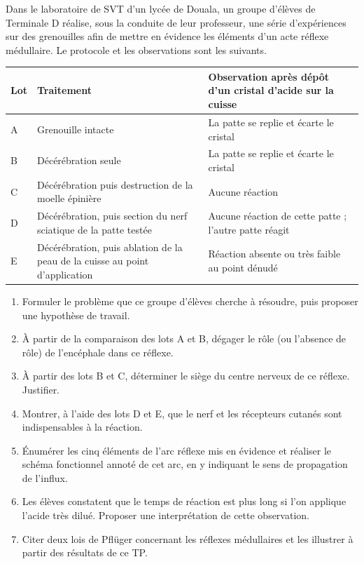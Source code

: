 \documentclass[11pt]{article}
\begin{document}
\begin{exercice}
Dans le laboratoire de SVT d'un lycée de Douala, un groupe d'élèves de Terminale D réalise, sous la conduite de leur professeur, une série d'expériences sur des grenouilles afin de mettre en évidence les éléments d'un acte réflexe médullaire. Le protocole et les observations sont les suivants.

\begin{center}
\begin{tabularx}{\linewidth}{|l|X|X|}
\hline
\rowcolor{popblueL} \textbf{Lot} & \textbf{Traitement} & \textbf{Observation après dépôt d'un cristal d'acide sur la cuisse} \\
\hline
A & Grenouille intacte & La patte se replie et écarte le cristal \\
\hline
B & Décérébration seule & La patte se replie et écarte le cristal \\
\hline
C & Décérébration puis destruction de la moelle épinière & Aucune réaction \\
\hline
D & Décérébration, puis section du nerf sciatique de la patte testée & Aucune réaction de cette patte ; l'autre patte réagit \\
\hline
E & Décérébration, puis ablation de la peau de la cuisse au point d'application & Réaction absente ou très faible au point dénudé \\
\hline
\end{tabularx}
\end{center}

\begin{enumerate}
\item Formuler le problème que ce groupe d'élèves cherche à résoudre, puis proposer une hypothèse de travail.
\item À partir de la comparaison des lots A et B, dégager le rôle (ou l'absence de rôle) de l'encéphale dans ce réflexe.
\item À partir des lots B et C, déterminer le siège du centre nerveux de ce réflexe. Justifier.
\item Montrer, à l'aide des lots D et E, que le nerf et les récepteurs cutanés sont indispensables à la réaction.
\item Énumérer les cinq éléments de l'arc réflexe mis en évidence et réaliser le schéma fonctionnel annoté de cet arc, en y indiquant le sens de propagation de l'influx.
\item Les élèves constatent que le temps de réaction est plus long si l'on applique l'acide très dilué. Proposer une interprétation de cette observation.
\item Citer deux lois de Pflüger concernant les réflexes médullaires et les illustrer à partir des résultats de ce TP.
\end{enumerate}
\end{exercice}
\end{document}
